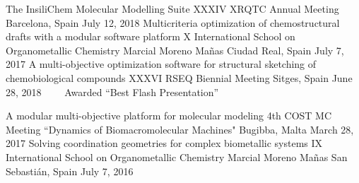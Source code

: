 


\begin{cventries}

  \cventry
    {The InsiliChem Molecular Modelling Suite} %
    {XXXIV XRQTC Annual Meeting} %
    {Barcelona, Spain} %
    {July 12, 2018} %
    {}
  \cventry
    {Multicriteria optimization of chemostructural drafts with a modular software platform} %
    {X International School on Organometallic Chemistry Marcial Moreno Mañas} %
    {Ciudad Real, Spain} %
    {July 7, 2017} %
    {}
  \cventry
    {A multi-objective optimization software for structural sketching of chemobiological compounds} %
    {XXXVI RSEQ Biennial Meeting} %
    {Sitges, Spain} %
    {June 28, 2018} %
    {~~~~\footnotesize{\faTag\acvHeaderIconSep\acvHeaderIconSep Awarded ``Best Flash Presentation''}}

  \cventry
    {A modular multi-objective platform for molecular modeling} %
    {4th COST MC Meeting ``Dynamics of Biomacromolecular Machines"} %
    {Bugibba, Malta} %
    {March 28, 2017} %
    {}
  \cventry
    {Solving coordination geometries for complex biometallic systems} %
    {IX International School on Organometallic Chemistry Marcial Moreno Mañas} %
    {San Sebastián, Spain} %
    {July 7, 2016} %
    {}
\end{cventries}
